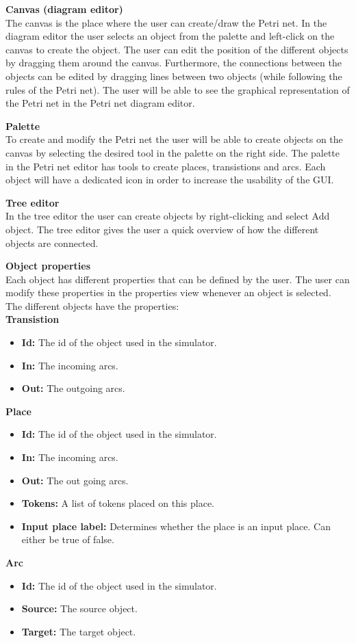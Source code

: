\textbf{Canvas (diagram editor)} \\
The canvas is the place where the user can create/draw the Petri net. In the diagram editor the user selects an object from the palette and left-click on the canvas to create the object. The user can edit the position of the different objects by dragging them around the canvas. Furthermore, the connections between the objects can be edited by dragging lines between two objects (while following the rules of the Petri net). The user will be able to see the graphical representation of the Petri net in the Petri net diagram editor. 

\textbf{Palette} \\
To create and modify the Petri net the user will be able to create objects on the canvas by selecting the desired tool in the palette on the right side. The palette in the Petri net editor has tools to create places, transistions and arcs. Each object will have a dedicated icon in order to increase the usability of the GUI.

\textbf{Tree editor} \\
In the tree editor the user can create objects by right-clicking and select Add object. The tree editor gives the user a quick overview of how the different objects are connected.

\textbf{Object properties} \\
Each object has different properties that can be defined by the user. The user can modify these properties in the properties view whenever an object is selected. The different objects have the properties: \\
\textbf{Transistion}
\begin{itemize}
\item{\textbf{Id:} The id of the object used in the simulator.}
\item{\textbf{In:} The incoming arcs.}
\item{\textbf{Out:} The outgoing arcs.}
\end{itemize}
\textbf{Place}%
\begin{itemize}
\item{\textbf{Id:} The id of the object used in the simulator.}
\item{\textbf{In:} The incoming arcs.}
\item{\textbf{Out:} The out going arcs.}
\item{\textbf{Tokens:} A list of tokens placed on this place.}
\item{\textbf{Input place label:} Determines whether the place is an input place. Can either be true of false.}
\end{itemize}
\textbf{Arc}%
\begin{itemize}
\item{\textbf{Id:} The id of the object used in the simulator.}
\item{\textbf{Source:} The source object.}
\item{\textbf{Target:} The target object.}
\end{itemize}

